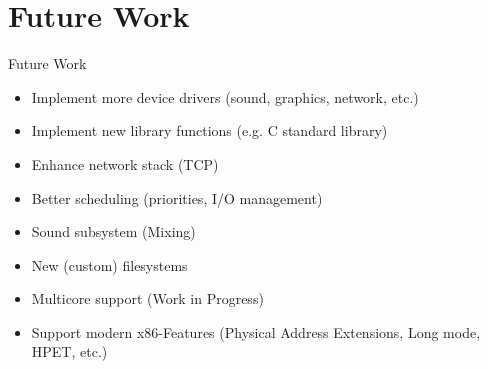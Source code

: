 \section{Future Work}

\begin{frame}{Future Work}
	\begin{itemize}
		\setlength\itemsep{1em}
		\item Implement more device drivers (sound, graphics, network, etc.)
		\item Implement new library functions (e.g. C standard library)
		\item Enhance network stack (TCP)
		\item Better scheduling (priorities, I/O management)
		\item Sound subsystem (Mixing)
		\item New (custom) filesystems
		\item Multicore support (Work in Progress)
		\item Support modern x86-Features (Physical Address Extensions, Long mode, HPET, etc.)
	\end{itemize}	
\end{frame}